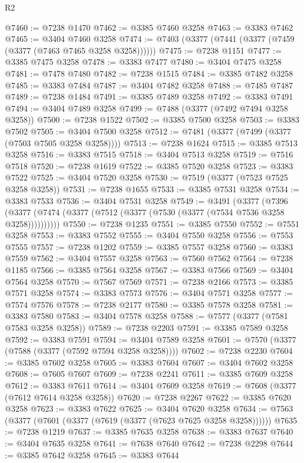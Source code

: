 \begin{lexlean}{R2}
\begin{coremodule}
@7460 := @7238 @1470
@7462 := @3385 @7460 @3258
@7463 := @3383 @7462
@7465 := @3404 @7460 @3258
@7474 := @7403 (@3377 (@7441 (@3377 (@7459 (@3377 (@7463 @7465 @3258 @3258))))))
@7475 := @7238 @1151
@7477 := @3385 @7475 @3258
@7478 := @3383 @7477
@7480 := @3404 @7475 @3258
@7481 := @7478 @7480
@7482 := @7238 @1515
@7484 := @3385 @7482 @3258
@7485 := @3383 @7484
@7487 := @3404 @7482 @3258
@7488 := @7485 @7487
@7489 := @7238 @1484
@7491 := @3385 @7489 @3258
@7492 := @3383 @7491
@7494 := @3404 @7489 @3258
@7499 := @7488 (@3377 (@7492 @7494 @3258 @3258))
@7500 := @7238 @1522
@7502 := @3385 @7500 @3258
@7503 := @3383 @7502
@7505 := @3404 @7500 @3258
@7512 := @7481 (@3377 (@7499 (@3377 (@7503 @7505 @3258 @3258))))
@7513 := @7238 @1624
@7515 := @3385 @7513 @3258
@7516 := @3383 @7515
@7518 := @3404 @7513 @3258
@7519 := @7516 @7518
@7520 := @7238 @1619
@7522 := @3385 @7520 @3258
@7523 := @3383 @7522
@7525 := @3404 @7520 @3258
@7530 := @7519 (@3377 (@7523 @7525 @3258 @3258))
@7531 := @7238 @1655
@7533 := @3385 @7531 @3258
@7534 := @3383 @7533
@7536 := @3404 @7531 @3258
@7549 := @3491
    (@3377
      (@7396 (@3377 (@7474 (@3377 (@7512 (@3377 (@7530 (@3377 (@7534 @7536 @3258 @3258))))))))))
@7550 := @7238 @1235
@7551 := @3385 @7550
@7552 := @7551 @3258
@7553 := @3383 @7552
@7555 := @3404 @7550 @3258
@7556 := @7553 @7555
@7557 := @7238 @1202
@7559 := @3385 @7557 @3258
@7560 := @3383 @7559
@7562 := @3404 @7557 @3258
@7563 := @7560 @7562
@7564 := @7238 @1185
@7566 := @3385 @7564 @3258
@7567 := @3383 @7566
@7569 := @3404 @7564 @3258
@7570 := @7567 @7569
@7571 := @7238 @2166
@7573 := @3385 @7571 @3258
@7574 := @3383 @7573
@7576 := @3404 @7571 @3258
@7577 := @7574 @7576
@7578 := @7238 @2177
@7580 := @3385 @7578 @3258
@7581 := @3383 @7580
@7583 := @3404 @7578 @3258
@7588 := @7577 (@3377 (@7581 @7583 @3258 @3258))
@7589 := @7238 @2203
@7591 := @3385 @7589 @3258
@7592 := @3383 @7591
@7594 := @3404 @7589 @3258
@7601 := @7570 (@3377 (@7588 (@3377 (@7592 @7594 @3258 @3258))))
@7602 := @7238 @2230
@7604 := @3385 @7602 @3258
@7605 := @3383 @7604
@7607 := @3404 @7602 @3258
@7608 := @7605 @7607
@7609 := @7238 @2241
@7611 := @3385 @7609 @3258
@7612 := @3383 @7611
@7614 := @3404 @7609 @3258
@7619 := @7608 (@3377 (@7612 @7614 @3258 @3258))
@7620 := @7238 @2267
@7622 := @3385 @7620 @3258
@7623 := @3383 @7622
@7625 := @3404 @7620 @3258
@7634 := @7563 (@3377 (@7601 (@3377 (@7619 (@3377 (@7623 @7625 @3258 @3258))))))
@7635 := @7238 @1219
@7637 := @3385 @7635 @3258
@7638 := @3383 @7637
@7640 := @3404 @7635 @3258
@7641 := @7638 @7640
@7642 := @7238 @2298
@7644 := @3385 @7642 @3258
@7645 := @3383 @7644

\end{coremodule}
\end{lexlean}
